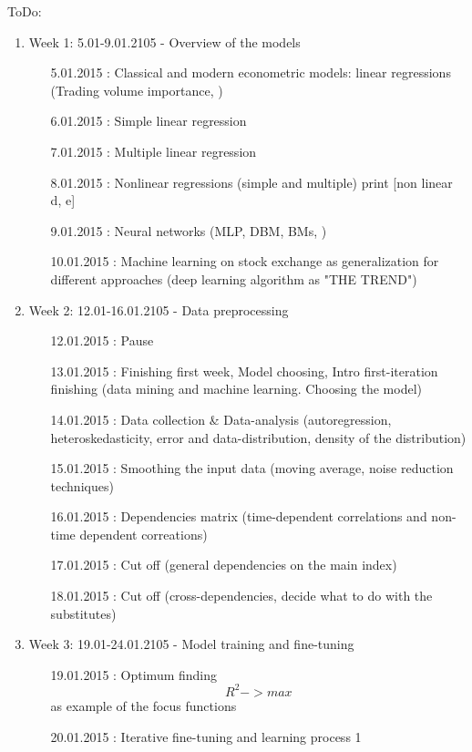\documentclass {article}
\begin{document}
ToDo:
\begin{enumerate}
	\item Week 1: 5.01-9.01.2105 - Overview of the models 
	\begin{enumerate}
		\item[5.01.2015]: Classical and modern econometric models:  linear regressions (Trading volume importance, ) 
		\item[6.01.2015]: Simple linear regression 	 		  
		\item[7.01.2015]: Multiple linear regression  
		\item[8.01.2015]: Nonlinear regressions (simple and multiple) print [non linear d, e]  
		\item[9.01.2015]: Neural networks (MLP, DBM, BMs, )
		\item[10.01.2015]: Machine learning on stock exchange as generalization for different approaches (deep learning algorithm as "THE TREND")
	\end{enumerate}
	\item Week 2: 12.01-16.01.2105 - Data preprocessing
	\begin{enumerate}
		\item[12.01.2015]: Pause
		\item[13.01.2015]: Finishing first week, Model choosing, Intro first-iteration finishing (data mining and machine learning. Choosing the model)
		\item[14.01.2015]: Data collection  \& Data-analysis (autoregression, heteroskedasticity, error and data-distribution, density of the distribution)
		\item[15.01.2015]: Smoothing the input data (moving average, noise reduction techniques)
		\item[16.01.2015]: Dependencies matrix  (time-dependent correlations and non-time dependent correations)
		\item[17.01.2015]: Cut off (general dependencies on the main index)
		\item[18.01.2015]: Cut off (cross-dependencies, decide what to do with the substitutes)
	\end{enumerate}
	\item Week 3: 19.01-24.01.2105 - Model training and fine-tuning
	\begin{enumerate}
		\item[19.01.2015]: Optimum finding  \[ R^2 -> max \] as example of the focus functions
		\item[20.01.2015]: Iterative fine-tuning and learning process 1

\end{enumerate}
\end{enumerate}
\end{document}
